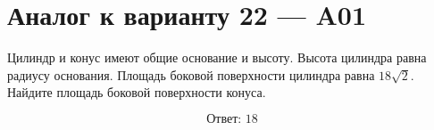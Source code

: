 \documentclass[12pt,a4paper]{article}
\begin{document}
\section*{Аналог к варианту 22 — A01}

Цилиндр и конус имеют общие основание и высоту. Высота цилиндра равна радиусу основания. Площадь боковой поверхности цилиндра равна \(18\sqrt2\). Найдите площадь боковой поверхности конуса.

\begin{center}
\end{center}

\[
\boxed{\text{Ответ: }18}
\]
\end{document}
